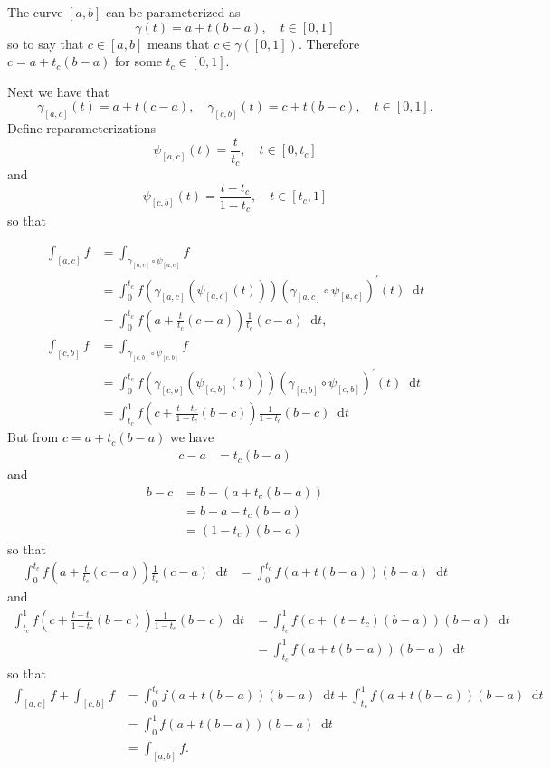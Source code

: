 \documentclass{article}
\newcommand\dif{\mathop{}\!\mathrm{d}}
\begin{document}
\begin{Answer}
The curve $[a, b]$ can be parameterized as
$$
\gamma(t) = a + t (b - a), \quad t \in [0, 1]
$$
so to say that $c \in [a, b]$ means that $c \in \gamma([0, 1])$.
Therefore $c = a + t_c (b - a)$ for some $t_c \in [0, 1]$.

Next we have that
$$
\gamma_{[a,c]}(t) = a + t(c - a), \quad
\gamma_{[c,b]}(t) = c + t(b - c), \quad
t \in [0, 1].
$$
Define reparameterizations
$$
\psi_{[a,c]}(t) = \frac{t}{t_c}, \quad t \in [0, t_c]
$$
and
$$
\psi_{[c,b]}(t) = \frac{t - t_c}{1 - t_c}, \quad t \in [t_c, 1]
$$
so that

\begin{align*}
   \int_{[a,c]} f
&= \int_{\gamma_{[a, c]} \circ \psi_{[a,c]}} f \\
&= \int_0^{t_c}
     f(\gamma_{[a, c]}(\psi_{[a,c]}(t)))
     (\gamma_{[a, c]} \circ \psi_{[a,c]})^\prime (t)
     \dif t \\
&= \int_0^{t_c}
     f\left(a + \frac{t}{t_c}(c - a)\right)
     \frac{1}{t_c}(c - a)
     \dif t, \\
   \int_{[c, b]} f
&= \int_{\gamma_{[c, b]} \circ \psi_{[c, b]}} f \\
&= \int_0^{t_c}
     f(\gamma_{[c, b]}(\psi_{[c, b]}(t)))
     (\gamma_{[c, b]} \circ \psi_{[c, b]})^\prime (t)
     \dif t \\
&= \int_{t_c}^{1}
     f\left(c + \frac{t - t_c}{1 - t_c}(b - c)\right)
     \frac{1}{1 - t_c}(b - c)
     \dif t
\end{align*}
But from $c = a + t_c(b-a)$ we have
\begin{align*}
c - a &= t_c (b - a)
\end{align*}
and
\begin{align*}
   b - c
&= b - (a + t_c (b - a)) \\
&= b - a - t_c(b - a) \\
&= (1 - t_c)(b - a)
\end{align*}
so that
\begin{align*}
\int_0^{t_c}
  f\left(a + \frac{t}{t_c}(c - a)\right)
  \frac{1}{t_c}(c - a)
  \dif t
&=
\int_0^{t_c}
  f(a + t(b - a))
  (b - a)
  \dif t
\end{align*}
and
\begin{align*}
\int_{t_c}^{1}
  f\left(c + \frac{t - t_c}{1 - t_c}(b - c)\right)
  \frac{1}{1 - t_c}(b - c) \dif t
&=
\int_{t_c}^{1}
  f(c + (t - t_c)(b - a))
  (b - a)
  \dif t \\
&=
\int_{t_c}^{1}
  f(a + t(b - a))
  (b - a)
  \dif t
\end{align*}
so that
\begin{align*}
\int_{[a,c]} f + \int_{[c,b]} f
&=
\int_0^{t_c}
  f(a + t(b - a))
  (b - a)
  \dif t
+
\int_{t_c}^{1}
  f(a + t(b - a))
  (b - a)
  \dif t \\
&=
\int_0^1
  f(a + t(b - a))
  (b - a)
  \dif t \\
&=
\int_{[a, b]} f.
\end{align*}

\end{Answer}
\end{document}
